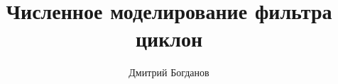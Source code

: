 \documentclass[a4paper,11pt]{report}
\title{Численное моделирование фильтра циклон}
\author{Дмитрий Богданов}
\begin{document}
\maketitle
\tableofcontents

\begin{abstract}
\end{abstract}

\chapter{}
\end{document}
